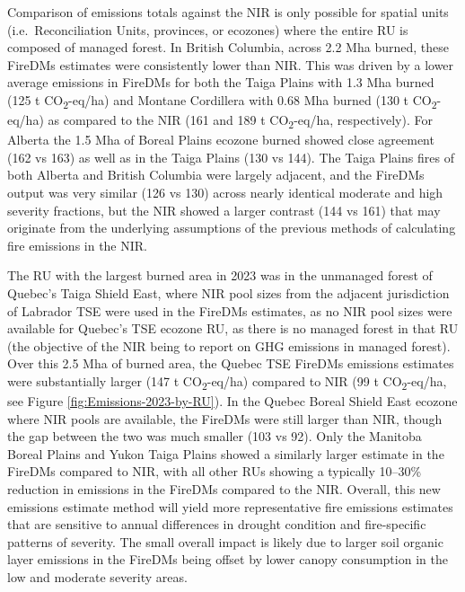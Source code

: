 \documentclass[, manuscript]{copernicus}
\begin{document}
Comparison of emissions totals against the NIR is only possible for
spatial units (i.e.~Reconciliation Units, provinces, or ecozones) where
the entire RU is composed of managed forest. In British Columbia, across
2.2 Mha burned, these FireDMs estimates were consistently lower than
NIR. This was driven by a lower average emissions in FireDMs for both
the Taiga Plains with 1.3 Mha burned (125 t CO\textsubscript{2}-eq/ha)
and Montane Cordillera with 0.68 Mha burned (130 t
CO\textsubscript{2}-eq/ha) as compared to the NIR (161 and 189 t
CO\textsubscript{2}-eq/ha, respectively). For Alberta the 1.5 Mha of
Boreal Plains ecozone burned showed close agreement (162 vs 163) as well
as in the Taiga Plains (130 vs 144). The Taiga Plains fires of both
Alberta and British Columbia were largely adjacent, and the FireDMs
output was very similar (126 vs 130) across nearly identical moderate
and high severity fractions, but the NIR showed a larger contrast (144
vs 161) that may originate from the underlying assumptions of the
previous methods of calculating fire emissions in the NIR.

The RU with the largest burned area in 2023 was in the unmanaged forest
of Quebec's Taiga Shield East, where NIR pool sizes from the adjacent
jurisdiction of Labrador TSE were used in the FireDMs estimates, as no
NIR pool sizes were available for Quebec's TSE ecozone RU, as there is
no managed forest in that RU (the objective of the NIR being to report
on GHG emissions in managed forest). Over this 2.5 Mha of burned area,
the Quebec TSE FireDMs emissions estimates were substantially larger
(147 t CO\textsubscript{2}-eq/ha) compared to NIR (99 t
CO\textsubscript{2}-eq/ha, see Figure \ref{fig:Emissions-2023-by-RU}).
In the Quebec Boreal Shield East ecozone where NIR pools are available,
the FireDMs were still larger than NIR, though the gap between the two
was much smaller (103 vs 92). Only the Manitoba Boreal Plains and Yukon
Taiga Plains showed a similarly larger estimate in the FireDMs compared
to NIR, with all other RUs showing a typically 10--30\% reduction in
emissions in the FireDMs compared to the NIR. Overall, this new
emissions estimate method will yield more representative fire emissions
estimates that are sensitive to annual differences in drought condition
and fire-specific patterns of severity. The small overall impact is
likely due to larger soil organic layer emissions in the FireDMs being
offset by lower canopy consumption in the low and moderate severity
areas.
\end{document}
